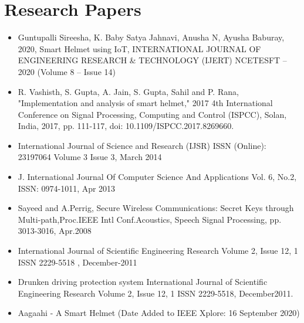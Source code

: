 \section*{Research Papers}
\begin{itemize}
	\item Guntupalli Sireesha, K. Baby Satya Jahnavi, Anusha N, Ayusha Baburay, 2020, Smart Helmet using IoT, INTERNATIONAL JOURNAL OF ENGINEERING RESEARCH \& TECHNOLOGY (IJERT) NCETESFT – 2020 (Volume 8 – Issue 14)
	\item R. Vashisth, S. Gupta, A. Jain, S. Gupta, Sahil and P. Rana, "Implementation and analysis of smart helmet," 2017 4th International Conference on Signal Processing, Computing and Control (ISPCC), Solan, India, 2017, pp. 111-117, doi: 10.1109/ISPCC.2017.8269660. 
	\item International Journal of Science and Research (IJSR) ISSN (Online): 23197064 Volume 3 Issue 3, March 2014 
	\item J. International Journal Of Computer Science And Applications Vol. 6, No.2, ISSN: 0974-1011, Apr 2013 
	\item Sayeed and A.Perrig, Secure Wireless Communications: Secret Keys through Multi-path,Proc.IEEE Intl Conf.Acoustics, Speech Signal Processing, pp. 3013-3016, Apr.2008 
	\item International Journal of Scientific Engineering Research Volume 2, Issue 12, 1 ISSN 2229-5518 , December-2011 
	\item Drunken driving protection system International Journal of Scientific Engineering Research Volume 2, Issue 12, 1 ISSN 2229-5518, December2011.
	\item Aagaahi - A Smart Helmet (Date Added to IEEE Xplore: 16 September 2020) 
\end{itemize}

